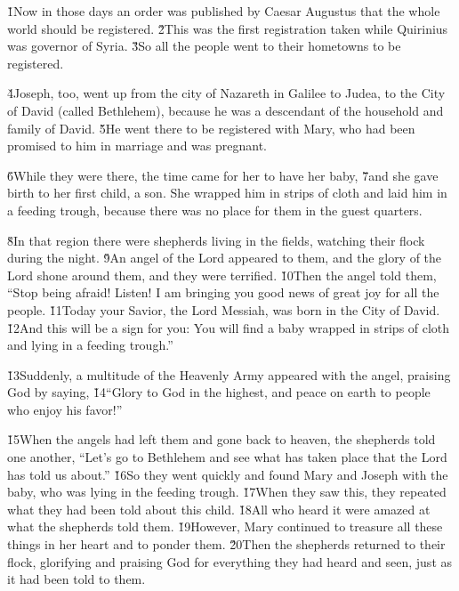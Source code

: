 \v{1}Now in those days an order was published by Caesar Augustus that the whole world should be registered. \v{2}This was the first registration taken while Quirinius was governor of Syria. \v{3}So all the people went to their hometowns to be registered.

\v{4}Joseph, too, went up from the city of Nazareth in Galilee to Judea, to the City of David (called Bethlehem), because he was a descendant of the household and family of David. \v{5}He went there to be registered with Mary, who had been promised to him in marriage and was pregnant.

\v{6}While they were there, the time came for her to have her baby, \v{7}and she gave birth to her first child, a son. She wrapped him in strips of cloth and laid him in a feeding trough, because there was no place for them in the guest quarters.

\v{8}In that region there were shepherds living in the fields, watching their flock during the night. \v{9}An angel of the Lord appeared to them, and the glory of the Lord shone around them, and they were terrified. \v{10}Then the angel told them, ``Stop being afraid! Listen! I am bringing you good news of great joy for all the people. \v{11}Today your Savior, the Lord Messiah, was born in the City of David. \v{12}And this will be a sign for you: You will find a baby wrapped in strips of cloth and lying in a feeding trough.''

\v{13}Suddenly, a multitude of the Heavenly Army appeared with the angel, praising God by saying, \v{14}``Glory to God in the highest, and peace on earth to people who enjoy his favor!''

\v{15}When the angels had left them and gone back to heaven, the shepherds told one another, ``Let's go to Bethlehem and see what has taken place that the Lord has told us about.'' \v{16}So they went quickly and found Mary and Joseph with the baby, who was lying in the feeding trough. \v{17}When they saw this, they repeated what they had been told about this child. \v{18}All who heard it were amazed at what the shepherds told them. \v{19}However, Mary continued to treasure all these things in her heart and to ponder them. \v{20}Then the shepherds returned to their flock, glorifying and praising God for everything they had heard and seen, just as it had been told to them.

